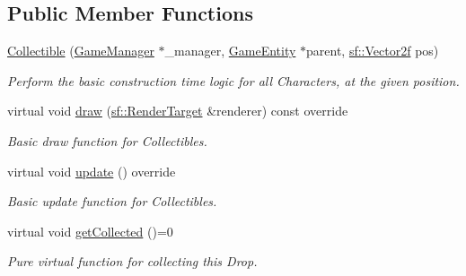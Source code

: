 \subsection*{Public Member Functions}
\begin{DoxyCompactItemize}
\item 
\mbox{\hyperlink{class_collectible_a932aefe3be93a008663fdca461498d18}{Collectible}} (\mbox{\hyperlink{class_game_manager}{Game\+Manager}} $\ast$\+\_\+manager, \mbox{\hyperlink{class_game_entity}{Game\+Entity}} $\ast$parent, \mbox{\hyperlink{classsf_1_1_vector2}{sf\+::\+Vector2f}} pos)
\begin{DoxyCompactList}\small\item\em Perform the basic construction time logic for all Characters, at the given position. \end{DoxyCompactList}\item 
virtual void \mbox{\hyperlink{class_collectible_a4bd92e0f368cd712b86e3ebabc3599f1}{draw}} (\mbox{\hyperlink{classsf_1_1_render_target}{sf\+::\+Render\+Target}} \&renderer) const override
\begin{DoxyCompactList}\small\item\em Basic draw function for Collectibles. \end{DoxyCompactList}\item 
\mbox{\label{class_collectible_aad821fbe9bf46f17e83c1a7082bfc21d}} 
virtual void \mbox{\hyperlink{class_collectible_aad821fbe9bf46f17e83c1a7082bfc21d}{update}} () override
\begin{DoxyCompactList}\small\item\em Basic update function for Collectibles. \end{DoxyCompactList}\item 
\mbox{\label{class_collectible_a315b42ebd948f3dec82acdc9f9f3e6cc}} 
virtual void \mbox{\hyperlink{class_collectible_a315b42ebd948f3dec82acdc9f9f3e6cc}{get\+Collected}} ()=0
\begin{DoxyCompactList}\small\item\em Pure virtual function for collecting this Drop. \end{DoxyCompactList}\end{DoxyCompactItemize}
